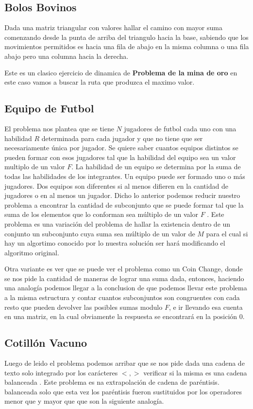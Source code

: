 \subsection{Bolos Bovinos} Dada una matriz triangular con valores hallar el camino con mayor suma comenzando desde la punta de arriba del triangulo hacia la base, sabiendo que los movimientos permitidos es hacia una fila de abajo  en la misma columna o una fila abajo pero una columna hacia la derecha. 

Este es un clasico ejercicio de dinamica de \textbf{Problema de la mina de oro} en este caso vamos a buscar la ruta que produzca el maximo valor.

\subsection{Equipo de Futbol} El problema nos plantea que se tiene $N$ jugadores de futbol cada uno con una habilidad $R$ determinada para cada jugador y que no tiene que ser necesariamente única por jugador. Se quiere saber cuantos equipos distintos se pueden formar con esos jugadores tal que la habilidad del equipo sea un valor multiplo de un valor $F$. La habilidad de un equipo se determina por la suma de todas las habilidades de los integrantes. Un equipo puede ser formado uno o más jugadores. Dos equipos son diferentes si al menos difieren en la cantidad de jugadores o en al menos un jugador. Dicho lo anterior podemos reducir nuestro problema a encontrar la cantidad de subconjunto que se puede formar tal que la suma de los elementos que lo conforman sea múltiplo de un valor $F$ . Este problema es una variación del problema de hallar la existencia dentro de un conjunto un subconjunto cuya suma sea múltiplo de un valor de $M$ para el cual si hay un algortimo conocido por lo nuestra solución ser hará modificando el algoritmo original.


Otra variante es ver que se puede ver el problema como un Coin Change, donde se nos pide la cantidad de maneras de lograr una suma dada, entonces, haciendo una analogía podemos llegar a la conclusion de que podemos llevar este problema a la misma estructura y contar cuantos subconjuntos son congruentes con cada resto que pueden devolver las posibles sumas modulo $F$, e ir llevando esa cuenta en una matriz, en la cual obviamente la respuesta se encontrará en la posición 0.  

\subsection{Cotillón Vacuno} Luego de leido el problema podemos arribar que se nos pide dada una cadena de texto solo integrado por los carácteres $<,>$ verificar si la misma es una cadena balanceada . Este problema es na extrapolación de cadena de paréntisis. balanceada solo que esta vez los paréntisis fueron sustituidos por los operadores menor que y mayor que que son la siguiente analogía.

